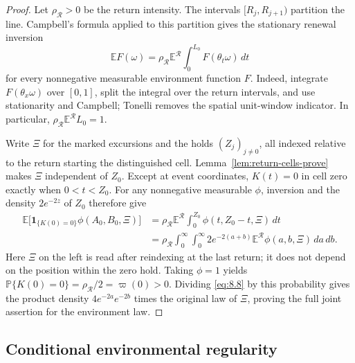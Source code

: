 \documentclass[11pt,reqno]{amsart}
\theoremstyle{definition}
\theoremstyle{remark}
\numberwithin{equation}{section}
\newcommand{\E}{\mathbb E}
\newcommand{\Pp}{\mathbb P}
\begin{document}
\begin{proof}
Let \(\rho_{\mathcal R}>0\) be the return intensity.  The intervals
\([R_j,R_{j+1})\) partition the line.  Campbell's formula applied to this
partition gives the stationary renewal inversion
\begin{equation}
\E F(\omega)
=\rho_{\mathcal R}\E^{\mathcal R}
  \int_0^{L_0}F(\theta_t\omega)\,dt
\label{eq:8.7}
\end{equation}
for every nonnegative measurable environment function \(F\).  Indeed,
integrate \(F(\theta_x\omega)\) over \([0,1]\), split the integral over
the return intervals, and use stationarity and Campbell; Tonelli removes
the spatial unit-window indicator.  In particular,
\(\rho_{\mathcal R}\E^{\mathcal R}L_0=1\).

Write \(\Xi\) for the marked excursions and the holds \((Z_j)_{j\ne0}\),
all indexed relative to the return starting the distinguished cell.
Lemma~\ref{lem:return-cells-prove} makes \(\Xi\) independent of \(Z_0\).
Except at event coordinates, \(K(t)=0\) in cell zero exactly when
\(0<t<Z_0\).  For any nonnegative measurable \(\phi\), inversion and
the density \(2e^{-2z}\) of \(Z_0\) therefore give
\begin{equation}
\begin{aligned}
\E\bigl[\mathbf1_{\{K(0)=0\}}\phi(A_0,B_0,\Xi)\bigr]
&=\rho_{\mathcal R}\E^{\mathcal R}
    \int_0^{Z_0}\phi(t,Z_0-t,\Xi)\,dt\\
&=\rho_{\mathcal R}\int_0^\infty\!\int_0^\infty
    2e^{-2(a+b)}\E^{\mathcal R}\phi(a,b,\Xi)\,da\,db.
\end{aligned}
\label{eq:8.8}
\end{equation}
Here \(\Xi\) on the left is read after reindexing at the last return;
it does not depend on the position within the zero hold.  Taking
\(\phi=1\) yields
\(\Pp\{K(0)=0\}=\rho_{\mathcal R}/2=\varpi(0)>0\).
Dividing \eqref{eq:8.8} by this probability gives the product density
\(4e^{-2a}e^{-2b}\) times the original law of \(\Xi\), proving the
full joint assertion for the environment law.
\end{proof}

\subsection{Conditional environmental regularity}
\end{document}
